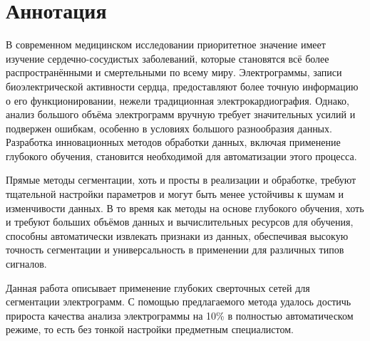 \section*{Аннотация}

В современном медицинском исследовании приоритетное значение имеет изучение
сердечно-сосудистых заболеваний, которые становятся всё более распространёнными
и смертельными по всему миру. Электрограммы, записи биоэлектрической активности
сердца, предоставляют более точную информацию о его функционировании, нежели
традиционная электрокардиография. Однако, анализ большого объёма электрограмм
вручную требует значительных усилий и подвержен ошибкам, особенно в условиях
большого разнообразия данных. Разработка инновационных методов обработки данных,
включая применение глубокого обучения, становится необходимой для автоматизации
этого процесса.

Прямые методы сегментации, хоть и просты в реализации и обработке, требуют
тщательной настройки параметров и могут быть менее устойчивы к шумам и
изменчивости данных. В то время как методы на основе глубокого обучения, хоть и
требуют больших объёмов данных и вычислительных ресурсов для обучения, способны
автоматически извлекать признаки из данных, обеспечивая высокую точность
сегментации и универсальность в применении для различных типов сигналов.

Данная работа описывает применение глубоких сверточных сетей для сегментации
электрограмм. С помощью предлагаемого метода удалось достичь прироста качества
анализа электрограммы на 10\% в полностью автоматическом режиме, то есть без
тонкой настройки предметным специалистом.
